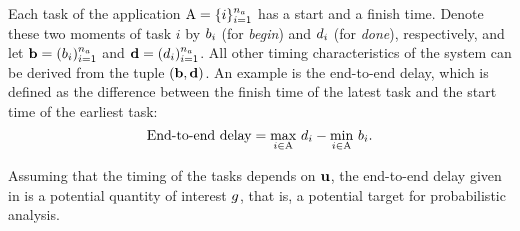 Each task of the application $\mathrm{A} = \{ i \}_{i = 1}^{n_a}$ has a start and a
finish time. Denote these two moments of task $i$ by $b_i$ (for \emph{begin})
and $d_i$ (for \emph{done}), respectively, and let $\mathbf{b} = (b_i)_{i=1}^{n_a}$ and
$\mathbf{d} = (d_i)_{i=1}^{n_a}$. All other timing characteristics of the system can be
derived from the tuple $(\mathbf{b}, \mathbf{d})$. An example is the end-to-end delay, which
is defined as the difference between the finish time of the latest task and the
start time of the earliest task:
\begin{equation} \elab{end-to-end-delay}
  \text{End-to-end delay} = \max_{i \in \tasks} \, \d_i - \min_{i \in \tasks} \, \b_i.
\end{equation}

Assuming that the timing of the tasks depends on $\mathbf{u}$, the end-to-end delay
given in  is a potential quantity of interest $g$, that
is, a potential target for probabilistic analysis.
